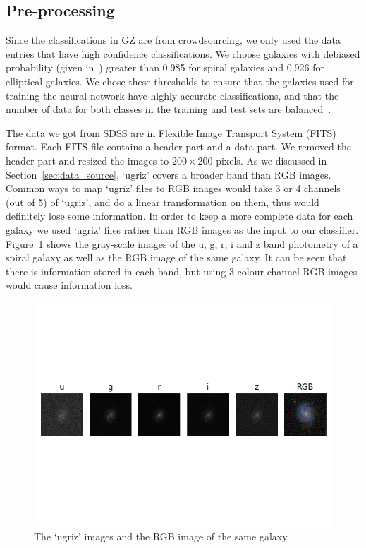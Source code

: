 \subsection{Pre-processing}
Since the classifications in GZ are from crowdsourcing, we only used the data entries that have high confidence classifications. 
We choose galaxies with debiased probability (given in~\cite{lintott2010galaxy}) greater than 0.985 for spiral galaxies and 0.926 for elliptical galaxies.
We chose these thresholds to ensure that the galaxies used for training the neural network have highly accurate classifications, and that the number of data for both classes in the training and test sets are balanced~\cite{khan2019deep}. 

The data we got from SDSS are in Flexible Image Transport System (FITS) format. 
Each FITS file contains a header part and a data part. We removed the header part and resized the images to $200 \times 200$ pixels. As we discussed in Section~\ref{sec:data_source}, `ugriz' covers a broader band than RGB images. Common ways to map `ugriz' files to RGB images would take 3 or 4 channels (out of 5) of `ugriz', and do a linear transformation on them, thus would definitely lose some information. 
In order to keep a more complete data for each galaxy we used `ugriz' files rather than RGB images as the input to our classifier. Figure~\ref{fig:ugriz} shows the gray-scale images of the u, g, r, i and z band photometry of a spiral galaxy as well as the RGB image of the same galaxy. It can be seen that there is information stored in each band, but using 3 colour channel RGB images would cause information loss.

\begin{figure}[h]
	\centering
	\captionsetup{justification=centering}
	\includegraphics[trim={0 4cm 0 4cm},clip]{Figures/ugriz_vs_rgb.png}
	\caption{The `ugriz' images and the RGB image of the same galaxy.}
	\label{fig:ugriz}
\end{figure}

